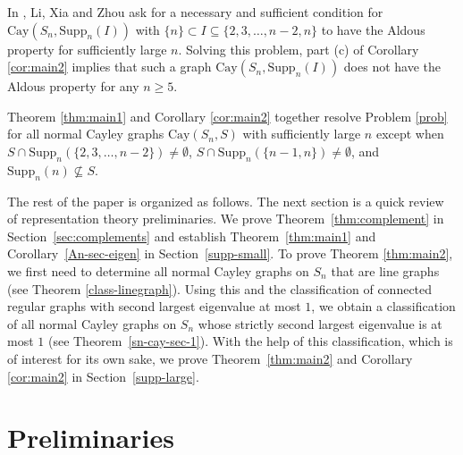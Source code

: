 \documentclass[12pt, a4paper]{article}
\theoremstyle{definition}
\begin{document}
In \cite[Problem 1.2]{LXZ}, Li, Xia and Zhou ask for a necessary and sufficient condition for $\mathrm{Cay}(S_n, \mathrm{Supp}_n(I))$ with $\{n\} \subset I \subseteq \{2,3,\ldots,n-2,n\}$ to have the Aldous property for sufficiently large $n$. Solving this problem, part (c) of Corollary \ref{cor:main2} implies that such a graph $\mathrm{Cay}(S_n, \mathrm{Supp}_n(I))$ does not have the Aldous property for any $n \geq 5$. 

Theorem \ref{thm:main1} and Corollary \ref{cor:main2} together resolve Problem \ref{prob} for all normal Cayley graphs $\mathrm{Cay}(S_n, S)$ with sufficiently large $n$ except when $S \cap \mathrm{Supp}_n(\{2, 3, \dots, n-2\}) \neq \emptyset$, $S \cap \mathrm{Supp}_n(\{n-1, n\}) \neq \emptyset$, and $\mathrm{Supp}_n(n) \not\subseteq S$.

The rest of the paper is organized as follows. The next section is a quick review of representation theory preliminaries. We prove Theorem~\ref{thm:complement} in Section~\ref{sec:complements} and establish Theorem~\ref{thm:main1} and Corollary~\ref{An-sec-eigen} in Section~\ref{supp-small}. To prove Theorem \ref{thm:main2}, we first need to determine all normal Cayley graphs on $S_n$ that are line graphs (see Theorem \ref{class-linegraph}). Using this and the classification \cite{Stanic2010} of connected regular graphs with second largest eigenvalue at most $1$, we obtain a classification of all normal Cayley graphs on $S_n$ whose strictly second largest eigenvalue is at most $1$ (see Theorem~\ref{sn-cay-sec-1}). With the help of this classification, which is of interest for its own sake, we prove Theorem~\ref{thm:main2} and Corollary \ref{cor:main2} in Section~\ref{supp-large}. 
 

\section{Preliminaries}\label{sec:preliminaries}
\end{document}
